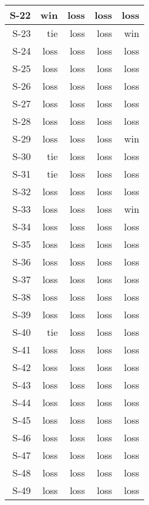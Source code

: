 \begin{tabular}{ | r | r | r | r | r | }
    \hline
         S-22  &    win  &   loss  &   loss  &   loss  \\
    \hline
         S-23  &    tie  &   loss  &   loss  &    win  \\
    \hline
         S-24  &   loss  &   loss  &   loss  &   loss  \\
    \hline
         S-25  &   loss  &   loss  &   loss  &   loss  \\
    \hline
         S-26  &   loss  &   loss  &   loss  &   loss  \\
    \hline
         S-27  &   loss  &   loss  &   loss  &   loss  \\
    \hline
         S-28  &   loss  &   loss  &   loss  &   loss  \\
    \hline
         S-29  &   loss  &   loss  &   loss  &    win  \\
    \hline
         S-30  &    tie  &   loss  &   loss  &   loss  \\
    \hline
         S-31  &    tie  &   loss  &   loss  &   loss  \\
    \hline
         S-32  &   loss  &   loss  &   loss  &   loss  \\
    \hline
         S-33  &   loss  &   loss  &   loss  &    win  \\
    \hline
         S-34  &   loss  &   loss  &   loss  &   loss  \\
    \hline
         S-35  &   loss  &   loss  &   loss  &   loss  \\
    \hline
         S-36  &   loss  &   loss  &   loss  &   loss  \\
    \hline
         S-37  &   loss  &   loss  &   loss  &   loss  \\
    \hline
         S-38  &   loss  &   loss  &   loss  &   loss  \\
    \hline
         S-39  &   loss  &   loss  &   loss  &   loss  \\
    \hline
         S-40  &    tie  &   loss  &   loss  &   loss  \\
    \hline
         S-41  &   loss  &   loss  &   loss  &   loss  \\
    \hline
         S-42  &   loss  &   loss  &   loss  &   loss  \\
    \hline
         S-43  &   loss  &   loss  &   loss  &   loss  \\
    \hline
         S-44  &   loss  &   loss  &   loss  &   loss  \\
    \hline
         S-45  &   loss  &   loss  &   loss  &   loss  \\
    \hline
         S-46  &   loss  &   loss  &   loss  &   loss  \\
    \hline
         S-47  &   loss  &   loss  &   loss  &   loss  \\
    \hline
         S-48  &   loss  &   loss  &   loss  &   loss  \\
    \hline
         S-49  &   loss  &   loss  &   loss  &   loss  \\
    \hline
\end{tabular}



